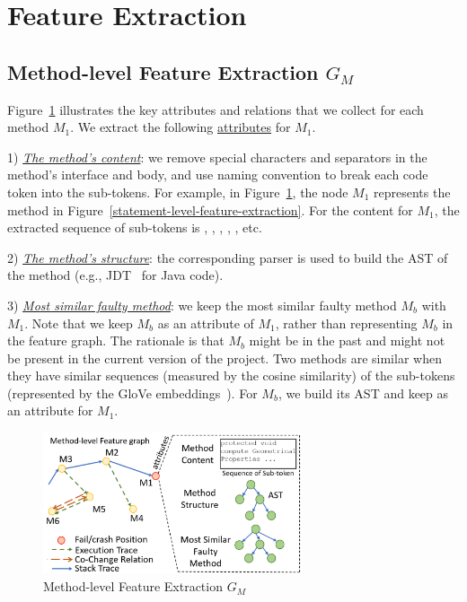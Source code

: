 \section{Feature Extraction}
\label{feature-extract:sec}




\subsection{Method-level Feature Extraction $G_M$}

Figure~\ref{method-level-feature-extraction} illustrates the key
attributes and relations that we collect for each method $M_1$. We
extract the following \underline{attributes} for
$M_1$.

1) {\em \underline{The method's content}}: we remove special
characters and separators in the method's interface and body, and use
naming convention to break each code token into the sub-tokens. For
example, in Figure~\ref{method-level-feature-extraction}, the node
$M_1$ represents the method  in
Figure~\ref{statement-level-feature-extraction}. For the content for
$M_1$, the extracted sequence of sub-tokens is ,
, , , ,
etc.

2) {\em \underline{The method's structure}}: the corresponding parser
is used to build the AST of the method (e.g., JDT~\cite{JDT} for Java
code).


3) {\em \underline{Most similar faulty method}}: we keep the most
similar faulty method $M_b$ with $M_1$. Note that we keep $M_b$ as an
attribute of $M_1$, rather than representing $M_b$ in the feature
graph. The rationale is that $M_b$ might be in the past and might not
be present in the current version of the project. Two methods are
similar when they have similar sequences (measured by the cosine
similarity) of the sub-tokens (represented by the GloVe
embeddings~\cite{glove2014}).  For $M_b$, we build its AST and
keep as an attribute for $M_1$.

  \begin{figure}[t]
	\centering
	\includegraphics[width=3in]{graphs/step-1-method.png}
        \vspace{-6pt}
        \caption{Method-level Feature Extraction $G_M$}
	\label{method-level-feature-extraction}
\end{figure}

